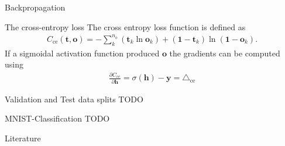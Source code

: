 \documentclass[notes]{beamer}
\begin{document}
    \begin{frame}{Backpropagation}
      \begin{figure}
         
      \end{figure}
    \end{frame}

    \begin{frame}{The cross-entropy loss}
      The cross entropy loss function is defined as \cite{nielsen2015neural, bishop2006pattern}
      \begin{align}
       C_{\text{ce}}(\mathbf{t}, \mathbf{o}) = -\sum_k^{n_o} ( \mathbf{t}_k  \ln \mathbf{o}_k) 
                                  + (\mathbf{1} - \mathbf{t}_k)
                                     \ln(\mathbf{1} - \mathbf{o}_k).
      \end{align}
      If a sigmoidal activation function produced $\mathbf{o}$ the gradients can be computed using ~\cite{nielsen2015neural,bishop2006pattern}
      \begin{align}
         \frac{\partial C_{ce}}{\partial \mathbf{h}} 
         = \sigma(\mathbf{h}) - \mathbf{y} = \triangle_{\text{ce}}
      \end{align}
    \end{frame}

    \begin{frame}{Validation and Test data splits}
      TODO
    \end{frame}

    \begin{frame}{MNIST-Classification}
      TODO
    \end{frame}

    \begin{frame}{Literature}
      \printbibliography
    \end{frame}
\end{document}
